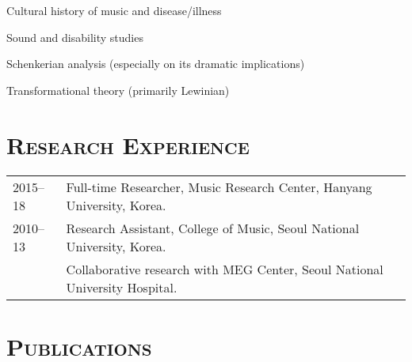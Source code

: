 \documentclass[a4paper,11pt]{article}
\begin{document}
  \noindent \hspace{2mm} \textbullet \hspace{2mm} Cultural history of music and disease/illness
  
  \noindent \hspace{2mm} \textbullet \hspace{2mm} Sound and disability studies
  
  \noindent \hspace{2mm} \textbullet \hspace{2mm} Schenkerian analysis (especially on its dramatic implications)
  
  \noindent \hspace{2mm} \textbullet \hspace{2mm} Transformational theory (primarily Lewinian)
  
  \vspace{2.5mm}
  
  \section*{\textsc{Research Experience}}
  
  \hspace*{-0.25cm}
  \begin{tabular}{p{2.5cm} l}
    2015--18 & Full-time Researcher, Music Research Center, Hanyang University, Korea.\\
    2010--13 & Research Assistant, College of Music, Seoul National University, Korea.\\
    & Collaborative research with MEG Center, Seoul National University Hospital.  
  \end{tabular}

  
  \section*{\textsc{Publications}}
\end{document}
